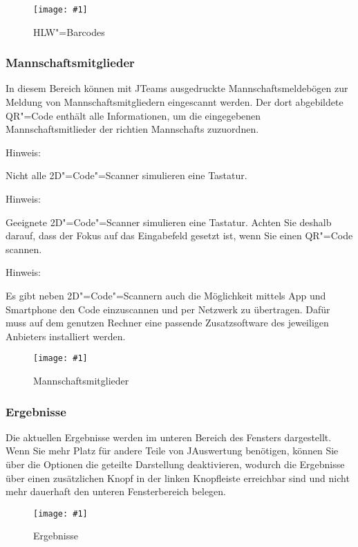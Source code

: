 \documentclass[11pt,a4paper,twoside,ngerman]{article}
\newcommand{\hsmimage}[3]{\begin{figure}[!ht]\centering\texttt{[image: \#1]}\caption{#3}\end{figure}}
\begin{document}
\hsmimage{pics/panel-hlw-barcodes}{.72\textwidth}{HLW"=Barcodes}

\subsubsection*{Mannschaftsmitglieder}
In diesem Bereich können mit JTeams ausgedruckte Mannschaftsmeldebögen zur Meldung von Mannschaftsmitgliedern eingescannt werden. Der dort abgebildete QR"=Code enthält alle Informationen, um die eingegebenen Mannschaftsmitlieder der richtien Mannschafts zuzuordnen.

\begin{bfseries}Hinweis:\end{bfseries} Nicht alle 2D"=Code"=Scanner simulieren eine Tastatur.

\begin{bfseries}Hinweis:\end{bfseries} Geeignete 2D"=Code"=Scanner simulieren eine Tastatur. Achten Sie deshalb darauf, dass der Fokus auf das Eingabefeld gesetzt ist, wenn Sie einen QR"=Code scannen.

\begin{bfseries}Hinweis:\end{bfseries} Es gibt neben 2D"=Code"=Scannern auch die Möglichkeit mittels App und Smartphone den Code einzuscannen und per Netzwerk zu übertragen. Dafür muss auf dem genutzen Rechner eine passende Zusatzsoftware des jeweiligen Anbieters installiert werden.


\hsmimage{pics/panel-mannschaftsmitglieder}{.80\textwidth}{Mannschaftsmitglieder}

\subsubsection*{Ergebnisse}
Die aktuellen Ergebnisse werden im unteren Bereich des Fensters dargestellt. Wenn Sie mehr Platz für andere Teile von JAuswertung benötigen, können Sie über die Optionen die \glqq{}geteilte Darstellung\grqq{} deaktivieren, wodurch die Ergebnisse über einen zusätzlichen Knopf in der linken Knopfleiste erreichbar sind und nicht mehr dauerhaft den unteren Fensterbereich belegen.


\hsmimage{pics/panel-ergebnisse}{.80\textwidth}{Ergebnisse}
\end{document}
